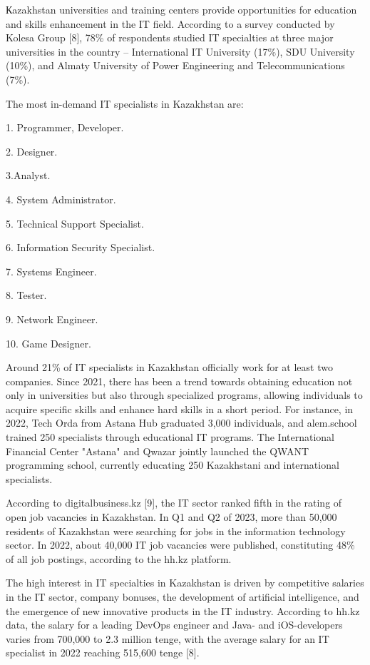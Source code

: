 \begin{multicols}{2}
Кazakhstan universities and training centers provide opportunities for
education and skills enhancement in the IT field. According to a survey
conducted by Kolesa Group {[}8{]}, 78\% of respondents studied IT
specialties at three major universities in the country -- International
IT University (17\%), SDU University (10\%), and Almaty University of
Power Engineering and Telecommunications (7\%).

The most in-demand IT specialists in Kazakhstan are:

1. Programmer, Developer.

2. Designer.

3.Analyst.

4. System Administrator.

5. Technical Support Specialist.

6. Information Security Specialist.

7. Systems Engineer.

8. Tester.

9. Network Engineer.

10. Game Designer.

Around 21\% of IT specialists in Kazakhstan officially work for at least
two companies. Since 2021, there has been a trend towards obtaining
education not only in universities but also through specialized
programs, allowing individuals to acquire specific skills and enhance
hard skills in a short period. For instance, in 2022, Tech Orda from
Astana Hub graduated 3,000 individuals, and alem.school trained 250
specialists through educational IT programs. The International Financial
Center "Astana" and Qwazar jointly launched the QWANT programming
school, currently educating 250 Kazakhstani and international
specialists.

According to digitalbusiness.kz {[}9{]}, the IT sector ranked fifth in
the rating of open job vacancies in Kazakhstan. In Q1 and Q2 of 2023,
more than 50,000 residents of Kazakhstan were searching for jobs in the
information technology sector. In 2022, about 40,000 IT job vacancies
were published, constituting 48\% of all job postings, according to the
hh.kz platform.

The high interest in IT specialties in Kazakhstan is driven by
competitive salaries in the IT sector, company bonuses, the development
of artificial intelligence, and the emergence of new innovative products
in the IT industry. According to hh.kz data, the salary for a leading
DevOps engineer and Java- and iOS-developers varies from 700,000 to 2.3
million tenge, with the average salary for an IT specialist in 2022
reaching 515,600 tenge {[}8{]}.


\end{multicols}
